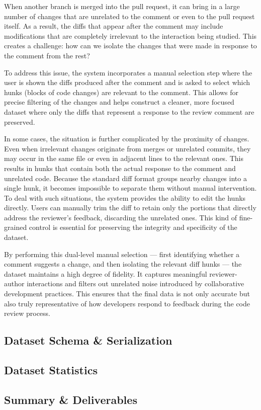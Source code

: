 When another branch is merged into the pull request, it can bring in a large number of changes that
are unrelated to the comment or even to the pull request itself. As a result, the diffs that appear
after the comment may include modifications that are completely irrelevant to the interaction being
studied. This creates a challenge: how can we isolate the changes that were made in response to the
comment from the rest?

To address this issue, the system incorporates a manual selection step where the user is shown the
diffs produced after the comment and is asked to select which hunks (blocks of code changes) are
relevant to the comment. This allows for precise filtering of the changes and helps construct a
cleaner, more focused dataset where only the diffs that represent a response to the review comment
are preserved.

In some cases, the situation is further complicated by the proximity of changes. Even when
irrelevant changes originate from merges or unrelated commits, they may occur in the same file or
even in adjacent lines to the relevant ones. This results in hunks that contain both the actual
response to the comment and unrelated code. Because the standard diff format groups nearby changes
into a single hunk, it becomes impossible to separate them without manual intervention. To deal with
such situations, the system provides the ability to edit the hunks directly. Users can manually trim
the diff to retain only the portions that directly address the reviewer’s feedback, discarding the
unrelated ones. This kind of fine-grained control is essential for preserving the integrity and
specificity of the dataset.

By performing this dual-level manual selection — first identifying whether a comment suggests a
change, and then isolating the relevant diff hunks — the dataset maintains a high degree of
fidelity. It captures meaningful reviewer-author interactions and filters out unrelated noise
introduced by collaborative development practices. This ensures that the final data is not only
accurate but also truly representative of how developers respond to feedback during the code review
process.


\subsection{Dataset Schema \& Serialization}
\subsection{Dataset Statistics}
\subsection{Summary \& Deliverables}

